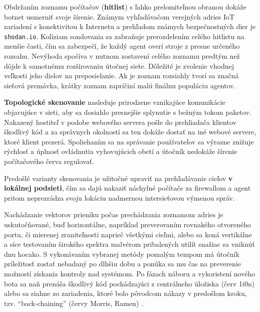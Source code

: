 \documentclass[12pt, a4paper]{article}
\begin{document}
Obdržaním zoznamu počítačov (\textbf{hitlist}) s ľahko prelomiteľnou obranou dokáže botnet usmerniť svoje 
šírenie. Známym vyhľadávačom verejných adries IoT zariadení s konektivitou k Internetu a prehľadom
známych bezpečnostných dier je \verb|shodan.io|. Kolíziam sondovania sa zabraňuje prerozdelením celého 
hitlistu na menšie časti, čím sa zabezpečí, že každý agent overí stroje z presne určeného rozsahu. Nevýhoda 
spočíva v nutnom zostavení celého zoznamu predtým než dôjde k samotnému rozširovaniu útočnej siete. Dôležité 
je zvolenie vhodnej veľkosti jeho dielov na preposielanie. Ak je zoznam rozsiahly tvorí sa značná sieťová 
premávka, krátky zoznam zapríčiní malú finálnu populáciu agentov. 

\textbf{Topologické skenovanie} nasleduje prirodzene vznikajúce komunikácie objavujúce v sieti, aby
sa dosiahlo presnejšie splynutie s bežným tokom paketov. Nakazený hostiteľ v podobe webového servera 
pošle do prehliadača klientov škodlivý kód a za správnych okolností sa ten dokáže dostať na iné webové
servere, ktoré klient prezerá. Spoliehaním sa na správanie používateľov sa výrazne znižuje rýchlosť a 
úplnosť ovládnutia vyhovujúcich obetí a útočník nedokáže šírenie počítačového červa regulovať.

Predošlé varianty skenovania je užitočné upraviť na prehľadávanie cieľov \textbf{v lokálnej podsieti}, 
čím sa dajú nakaziť náchylné počítače za firewallom a agent pritom neprezrádza svoju lokáciu nadmernou intersieťovou výmenou správ.   

Nachádzanie vektorov prieniku počas prechádzania zoznamom adries je uskutočňované, buď horizontálne,
napríklad preverovaním rovnakého otvoreného portu, či mierenej zraniteľnosti naprieč všetkými cieľmi, alebo
sa koná vertikálne a síce testovaním širokého spektra malvérom pribalených utilít snažiac sa vniknúť
dnu hocako. S vykonávaním vybranej metódy pomalým tempom má útočník príležitosť zostať nebadaný po dlhšiu
dobu a ponúka sa mu čas na preverenie možností získania kontroly nad systémom. Po fázach náboru a 
vykoristení nového bota sa naň prenáša škodlivý kód pochádzajúci z centrálneho úložiska (červ 1i0n) alebo
sa siahne zo zariadenia, ktoré bolo pôvodcom nákazy v predošlom kroku, tzv. \enquote{back-chaining} (červy
Morris, Ramen) \cite{ddos-anatomy-2004}. 
\end{document}
